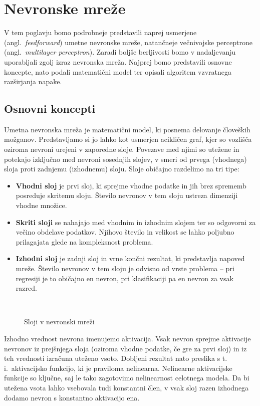 \chapter{Nevronske mreže}

V tem poglavju bomo podrobneje predstavili naprej usmerjene (angl.\ \textit{feedforward}) umetne nevronske mreže, natančneje večnivojske perceptrone (angl.\ \textit{multilayer perceptron}). Zaradi boljše berljivosti bomo v nadaljevanju uporabljali zgolj izraz nevronska mreža. Najprej bomo predstavili osnovne koncepte, nato podali matematični model ter opisali algoritem vzvratnega razširjanja napake.


\section{Osnovni koncepti}

Umetna nevronska mreža je matematični model, ki posnema delovanje človeških možganov. Predstavljamo si jo lahko kot usmerjen acikličen graf, kjer so vozlišča oziroma nevroni urejeni v zaporedne sloje. Povezave med njimi so utežene in potekajo izključno med nevroni sosednjih slojev, v smeri od prvega (vhodnega) sloja proti zadnjemu (izhodnemu) sloju. Sloje običajno razdelimo na tri tipe:
\begin{itemize}
  \item \textbf{Vhodni sloj} je prvi sloj, ki sprejme vhodne podatke in jih brez sprememb posreduje skritemu sloju. Število nevronov v tem sloju ustreza dimenziji vhodne množice.
  \item \textbf{Skriti sloji} se nahajajo med vhodnim in izhodnim slojem ter so odgovorni za večino obdelave podatkov. Njihovo število in velikost se lahko poljubno prilagajata glede na kompleksnost problema.
  \item \textbf{Izhodni sloj} je zadnji sloj in vrne končni rezultat, ki predstavlja napoved mreže. Število nevronov v tem sloju je odvisno od vrste problema – pri regresiji je to običajno en nevron, pri klasifikaciji pa en nevron za vsak razred. 
\end{itemize}

\begin{figure}[H]
  \centering
  
  \caption{Sloji v nevronski mreži}~\label{fig:nn-layers}
\end{figure}

Izhodno vrednost nevrona imenujemo aktivacija. Vsak nevron sprejme aktivacije nevronov iz prejšnjega sloja (oziroma vhodne podatke, če gre za prvi sloj) in iz teh vrednosti izračuna uteženo vsoto. Dobljeni rezultat nato preslika s t.\,i.\ aktivacijsko funkcijo, ki je praviloma nelinearna. Nelinearne aktivacijske funkcije so ključne, saj le tako zagotovimo nelinearnost celotnega modela. Da bi utežena vsota lahko vsebovala tudi konstantni člen, v vsak sloj razen izhodnega dodamo nevron s konstantno aktivacijo ena.

